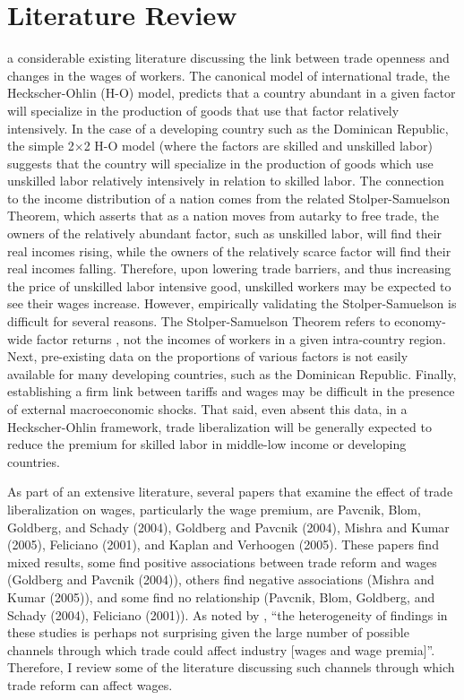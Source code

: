 \chapter{Literature Review}
\label{sec:Litreview}

 a considerable existing literature discussing the link between trade openness
and changes in the wages of workers.
The canonical model of international trade, the Heckscher-Ohlin (H-O) model, 
predicts that a country abundant in a given factor will specialize 
in the production of goods that use that factor relatively intensively.
In the case of a developing country such as the Dominican Republic, the 
simple 2$\times$2 H-O model (where the factors are skilled and unskilled labor) suggests that the 
country will specialize in the production of goods
which use unskilled labor relatively intensively in relation to skilled labor. 
The connection to the income distribution of a nation comes from the related Stolper-Samuelson Theorem,
which asserts that as a nation moves from autarky to free trade, the owners of the relatively
abundant factor, such as unskilled labor, will find their real incomes rising, while the owners of
the relatively scarce factor will find their real incomes falling. 
Therefore, upon lowering trade barriers, and thus increasing the price of unskilled labor intensive
good, unskilled workers may be expected to see their wages
increase. However, empirically validating the Stolper-Samuelson is difficult for several reasons. 
The Stolper-Samuelson Theorem refers to economy-wide factor returns \citep{goldberg}, not the 
incomes of workers in a  given intra-country region. Next, pre-existing data on the  proportions
of various factors is not easily available for many developing countries, such as the Dominican Republic.
Finally, establishing a firm link between tariffs and wages may be difficult in the presence of external
macroeconomic shocks. That said, even absent this data, in a Heckscher-Ohlin framework, trade 
liberalization will be generally expected to reduce the premium for skilled labor in middle-low 
income or developing countries. 

As part of an extensive literature, several papers that examine the effect of trade liberalization on 
wages, particularly the wage premium, are Pavcnik, Blom, Goldberg, and Schady (2004), Goldberg
and Pavcnik (2004), Mishra and Kumar (2005), Feliciano (2001), and Kaplan and Verhoogen (2005).
These papers find mixed results, some find positive associations between trade reform and wages 
(Goldberg and Pavcnik (2004)), others find negative associations (Mishra and Kumar (2005)), and some 
find no relationship (Pavcnik, Blom, Goldberg, and Schady (2004), Feliciano (2001)). As noted by 
\citet{goldberg}, ``the heterogeneity of findings in these studies is perhaps not surprising 
given the large number of possible channels through which trade could affect industry [wages 
and wage premia]''. Therefore, I review some of the literature discussing such channels through
which trade reform can affect wages.

